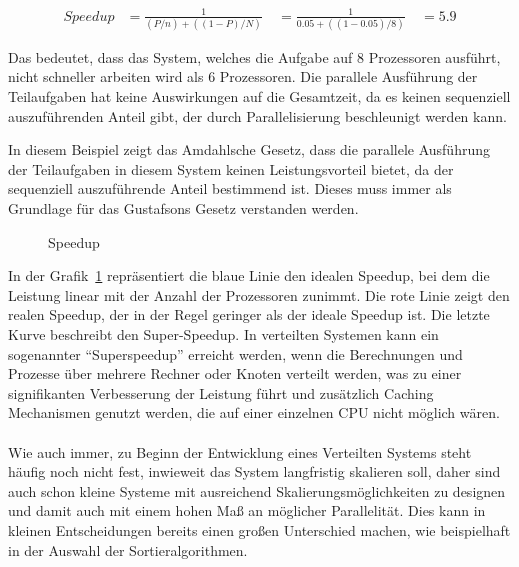 \documentclass[../vs-script-first-v01.tex]{subfiles}
\begin{document}
\begin{itemize}
        \begin{align*}
          Speedup & = \frac{1}{(P/n) + ((1 - P)/N)} \
                  & = \frac{1}{0.05 + ((1 - 0.05)/8)} \
                  & = 5.9
        \end{align*}

        Das bedeutet, dass das System, welches die Aufgabe auf 8 Prozessoren ausführt, nicht schneller arbeiten wird als 6 Prozessoren. Die parallele Ausführung der Teilaufgaben hat keine Auswirkungen auf die Gesamtzeit, da es keinen sequenziell auszuführenden Anteil gibt, der durch Parallelisierung beschleunigt werden kann.

        In diesem Beispiel zeigt das Amdahlsche Gesetz, dass die parallele Ausführung der Teilaufgaben in diesem System keinen Leistungsvorteil bietet, da der sequenziell auszuführende Anteil bestimmend ist. Dieses muss immer als Grundlage für das Gustafsons Gesetz verstanden werden.

        \begin{figure}[!h]
          \centering
          \caption{Speedup}
          \label{fig:speedup}
        \end{figure}

        In der Grafik~\ref{fig:speedup} repräsentiert die blaue Linie den idealen Speedup, bei dem die Leistung linear mit der Anzahl der Prozessoren zunimmt. Die rote Linie zeigt den realen Speedup, der in der Regel geringer als der ideale Speedup ist. Die letzte Kurve beschreibt den Super-Speedup.
        In verteilten Systemen kann ein sogenannter \enquote{Superspeedup} erreicht werden, wenn die Berechnungen und Prozesse über mehrere Rechner oder Knoten verteilt werden, was zu einer signifikanten Verbesserung der Leistung führt und zusätzlich Caching Mechanismen genutzt werden, die auf einer einzelnen CPU nicht möglich wären.\\
        \\
        Wie auch immer, zu Beginn der Entwicklung eines Verteilten Systems steht häufig noch nicht fest, inwieweit das System langfristig skalieren soll, daher sind auch schon kleine Systeme mit ausreichend Skalierungsmöglichkeiten zu designen und damit auch mit einem hohen Maß an möglicher Parallelität. Dies kann in kleinen Entscheidungen bereits einen großen Unterschied machen, wie beispielhaft in der Auswahl der Sortieralgorithmen.


\end{itemize}
\end{document}
